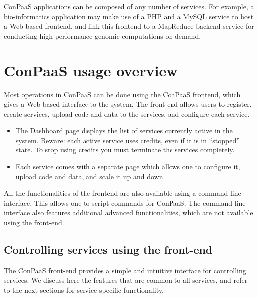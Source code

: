 \documentclass[10pt]{article}
\begin{document}
ConPaaS applications can be composed of any number of services. For
example, a bio-informatics application may make use of a PHP and a
MySQL service to host a Web-based frontend, and link this frontend to
a MapReduce backend service for conducting high-performance genomic
computations on demand.

\section{ConPaaS usage overview}

Most operations in ConPaaS can be done using the ConPaaS frontend,
which gives a Web-based interface to the system. The front-end allows
users to register, create services, upload code and data to the
services, and configure each service. 

\begin{itemize}
\item The Dashboard page displays the list of services currently
  active in the system. Beware: each active service uses credits, even
  if it is in ``stopped'' state. To stop using credits you must
  terminate the services completely.
\item Each service comes with a separate page which allows one to
  configure it, upload code and data, and scale it up and down.
\end{itemize}

All the functionalities of the frontend are also available using a
command-line interface. This allows one to script commands for
ConPaaS. The command-line interface also features additional advanced
functionalities, which are not available using the front-end.

\subsection{Controlling services using the front-end}

The ConPaaS front-end provides a simple and intuitive interface for
controlling services. We discuss here the features that are common to
all services, and refer to the next sections for service-specific
functionality.
\end{document}
